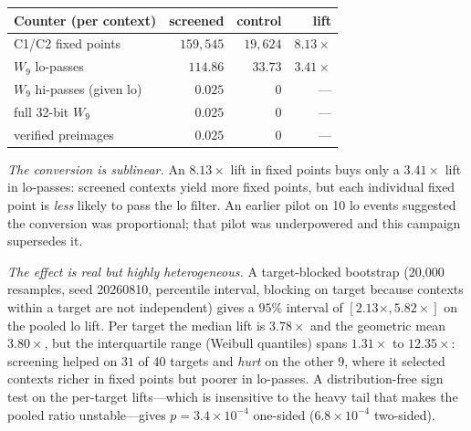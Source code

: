 \documentclass[11pt,a4paper]{article}
\begin{document}
\begin{center}
\begin{tabular}{@{}lrrr@{}}
\toprule
Counter (per context) & screened & control & lift \\
\midrule
C1/C2 fixed points & $159{,}545$ & $19{,}624$ & $8.13\times$ \\
$W_9$ lo-passes    & $114.86$    & $33.73$    & $\mathbf{3.41\times}$ \\
$W_9$ hi-passes (given lo) & $0.025$ & $0$ & --- \\
full 32-bit $W_9$  & $0.025$     & $0$        & --- \\
verified preimages & $0.025$     & $0$        & --- \\
\bottomrule
\end{tabular}
\end{center}

\emph{The conversion is sublinear.}  An $8.13\times$ lift in fixed points buys
only a $3.41\times$ lift in lo-passes: screened contexts yield more fixed
points, but each individual fixed point is \emph{less} likely to pass the lo
filter.  An earlier pilot on 10 lo events suggested the conversion was
proportional; that pilot was underpowered and this campaign supersedes it.

\emph{The effect is real but highly heterogeneous.}  A target-blocked bootstrap
(20{,}000 resamples, seed 20260810, percentile interval, blocking on target because contexts within a target are not independent) gives a $95\%$ interval of $[2.13\times, 5.82\times]$ on the
pooled lo lift.  Per target the median lift is $3.78\times$ and the geometric
mean $3.80\times$, but the interquartile range (Weibull quantiles) spans
$1.31\times$ to $12.35\times$: screening helped on $31$ of $40$ targets and \emph{hurt} on the
other $9$, where it selected contexts richer in fixed points but poorer in
lo-passes.  A distribution-free sign test on the per-target lifts---which is
insensitive to the heavy tail that makes the pooled ratio unstable---gives $p=3.4\times10^{-4}$ one-sided ($6.8\times10^{-4}$ two-sided).
\end{document}
